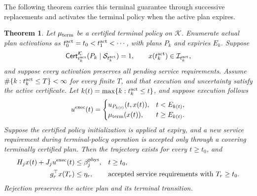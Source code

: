 \documentclass[preprint,12pt]{elsarticle}
\theoremstyle{definition}
\theoremstyle{plain}
\newtheorem{theorem}{Theorem}
\theoremstyle{definition}
\theoremstyle{plain}
\begin{document}
The following theorem carries this terminal guarantee through successive
replacements and activates the terminal policy when the active plan expires.

\begin{theorem}
\label{thm:backup-recursive-availability}
Let $\mu_{\rm term}$ be a certified terminal policy on $\mathcal K$. Enumerate
actual plan activations as $t_0^{\rm act}=t_0<t_1^{\rm act}<\cdots$,
with plans $P_k$ and expiries $E_k$. Suppose
\[
\mathsf{Cert}^{\mathcal K}_{t_k^{\rm act}}
 (P_k\mid\mathcal S_{t_k^{\rm act}})=1,\qquad
x(t_k^{\rm act})\in\mathcal I_{t_k^{\rm act}},
\]
and suppose every activation preserves all pending service requirements.
Assume $\#\{k:t_k^{\rm act}\le T\}<\infty$ for every finite $T$, and
that execution and uncertainty satisfy the active certificate. Let $k(t)=\max\{k:t_k^{\rm act}\le t\}$, and suppose execution follows
\begin{equation}
u^{\rm exec}(t)=\begin{cases}
u_{P_{k(t)}}(t,x(t)),&t<E_{k(t)},\\
\mu_{\rm term}(x(t)),&t\ge E_{k(t)}.
\end{cases}
\label{eq:terminal-execution-policy}
\end{equation}
Suppose the certified policy initialization is applied at expiry, and
a new service requirement during terminal-policy operation is accepted
only through a covering terminally certified plan. Then the trajectory exists for every $t\ge t_0$, and
\begin{equation}
\begin{aligned}
H_jx(t)+J_ju^{\rm exec}(t)&\le\beta_j^{\rm phys},
 &&t\ge t_0,\\
g_r^\top x(T_r)&\le\eta_r,
 &&\text{accepted service requirements with }T_r\ge t_0.
\end{aligned}
\label{eq:terminal-global-guarantee}
\end{equation}
Rejection preserves the active plan and its terminal transition.
\end{theorem}
\end{document}
